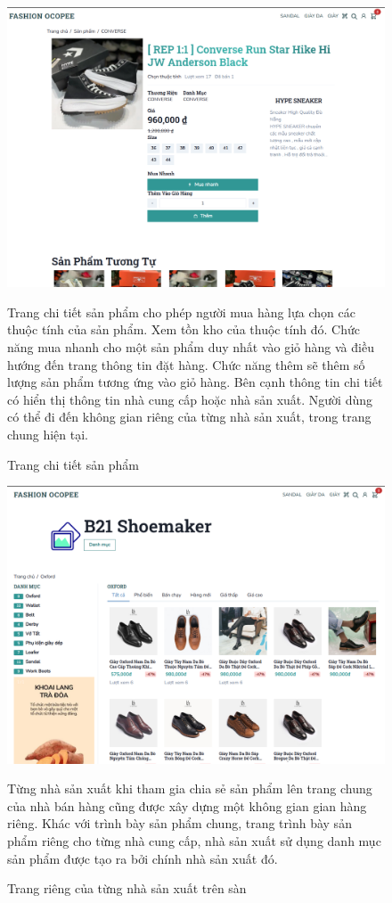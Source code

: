 \clearpage
\FloatBarrier
\begin{figure}[!htbp]\fontsize{13px}{13px}\selectfont
\centering
		\includegraphics[width=\textwidth]{./results/product-page}
		\caption{Trang chi tiết sản phẩm}
\justifying
Trang chi tiết sản phẩm cho phép người mua hàng lựa chọn các thuộc tính của sản phẩm. Xem tồn kho của thuộc tính đó. Chức năng mua nhanh cho một sản phẩm duy nhất vào giỏ hàng và điều hướng đến trang thông tin đặt hàng. Chức năng thêm sẽ thêm số lượng sản phẩm tương ứng vào giỏ hàng. Bên cạnh thông tin chi tiết có hiển thị thông tin nhà cung cấp hoặc nhà sản xuất. Người dùng có thể đi đến không gian riêng của từng nhà sản xuất, trong trang chung hiện tại.
\end{figure}
\clearpage
\FloatBarrier
\begin{figure}[!htbp]\fontsize{13px}{13px}\selectfont
\centering
		\includegraphics[width=\textwidth]{./results/store-page}
		\caption{Trang riêng của từng nhà sản xuất trên sàn}
\justifying
	Từng nhà sản xuất khi tham gia chia sẻ sản phẩm lên trang chung của nhà bán hàng cũng được xây dựng một không gian gian hàng riêng.
	Khác với trình bày sản phẩm chung, trang trình bày sản phẩm riêng cho từng nhà cung cấp, nhà sản xuất sử dụng danh mục sản phẩm được tạo ra bởi chính nhà sản xuất đó.
\end{figure}